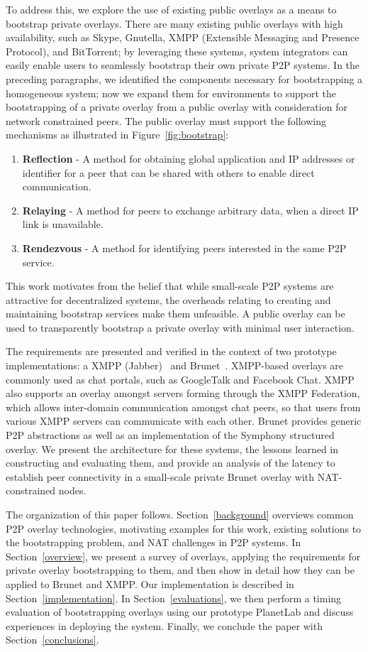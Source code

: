 \documentclass[conference]{IEEEtran}
\begin{document}
To address this, we explore the use of existing public overlays as a means to
bootstrap private overlays.  There are many existing public overlays with high
availability, such as Skype, Gnutella, XMPP (Extensible Messaging and Presence
Protocol), and BitTorrent; by leveraging these systems, system integrators can
easily enable users to seamlessly bootstrap their own private P2P systems.  In
the preceding paragraphs, we identified the components necessary for
bootstrapping a homogeneous system; now we expand them for environments to
support the bootstrapping of a private overlay from a public overlay with
consideration for network constrained peers.  The public overlay must support
the following mechanisms as illustrated in Figure~\ref{fig:bootstrap}:
\begin{enumerate}
\item \textbf{Reflection} - A method for obtaining global application and
IP addresses or identifier for a peer that can be shared with others to enable
direct communication.
\item \textbf{Relaying} - A method for peers to exchange arbitrary data, when
a direct IP link is unavailable.
\item \textbf{Rendezvous} - A method for identifying peers interested in the
same P2P service.
\end{enumerate}
This work motivates from the belief that while small-scale P2P systems are
attractive for decentralized systems, the overheads relating to creating and
maintaining bootstrap services make them unfeasible.  A public overlay can be
used to transparently bootstrap a private overlay with minimal user
interaction.

The requirements are presented and verified in the context of two prototype
implementations: a XMPP (Jabber)~\cite{xmpp} and Brunet~\cite{brunet}.
XMPP-based overlays are commonly used as chat portals, such as GoogleTalk and
Facebook Chat.  XMPP also supports an overlay amongst servers forming through
the XMPP Federation, which allows inter-domain communication amongst chat
peers, so that users from various XMPP servers can communicate with each other.
Brunet provides generic P2P abstractions as well as an implementation of the
Symphony structured overlay.  We present the architecture for these systems,
the lessons learned in constructing and evaluating them, and provide an
analysis of the latency to establish peer connectivity in a small-scale private
Brunet overlay with NAT-constrained nodes.

The organization of this paper follows.  Section~\ref{background} overviews
common P2P overlay technologies, motivating examples for this work, existing
solutions to the bootstrapping problem, and NAT challenges in P2P systems.  In
Section~\ref{overview}, we present a survey of overlays, applying the
requirements for private overlay bootstrapping to them, and then show in detail
how they can be applied to Brunet and XMPP.  Our implementation is described in
Section~\ref{implementation}.  In Section~\ref{evaluations}, we then perform a
timing evaluation of bootstrapping overlays using our prototype PlanetLab and
discuss experiences in deploying the system.  Finally, we conclude the paper
with Section~\ref{conclusions}.
\end{document}
